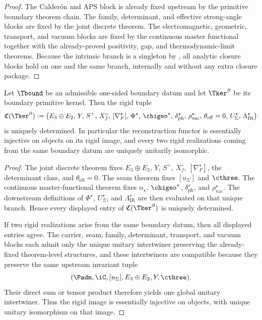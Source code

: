 \begin{proof}
The Calder\'on and APS block is already fixed upstream by the primitive boundary theorem chain.
The family, determinant, and effective strong-angle blocks are fixed by the joint discrete theorem.
The electromagnetic, geometric, transport, and vacuum blocks are fixed by the continuous master
functional together with the already-proved positivity, gap, and thermodynamic-limit theorems.
Because the intrinsic branch is a singleton by , all
analytic closure blocks hold on one and the same branch, internally and without any extra closure
package.
\end{proof}

\begin{theorem}
\label{thm:rigid-reconstruction-core}
\label{thm:canonical-rigid-reconstruction-essential-injective}
Let $\Tbound$ be an admissible one-sided boundary datum and let $\Tker^\partial$ be its boundary
primitive kernel. Then the rigid tuple
\[
\mathfrak C(\Tker^\partial)
:=
\bigl(
E_3\oplus E_2,\,
Y,\,
S^+,\,
X_f^\circ,\,
[\nabla_F^\star],\,
\Phi^\star,\,
\chigeo^\star,\,
\delta_{\mathrm{ph}}^\star,\,
\rho_{\mathrm{vac}}^\star,\,
\theta_{\mathrm{eff}}=0,\,
U_\Sigma^\star,\,
\Lambda_{\mathrm{IR}}^\star
\bigr)
\]
is uniquely determined. In particular the reconstruction functor is essentially injective on
objects on its rigid image, and every two rigid realizations coming from the same boundary datum are
uniquely unitarily isomorphic.
\end{theorem}

\begin{proof}
The joint discrete theorem fixes $E_3\oplus E_2$, $Y$, $S^+$, $X_f^\circ$, $[\nabla_F^\star]$, the
determinant class, and $\theta_{\mathrm{eff}}=0$. The seam theorem fixes $[u_\Sigma]$ and
$\cthree$. The continuous master-functional theorem fixes $\alpha_\star$, $\chigeo^\star$,
$\delta_{\mathrm{ph}}^\star$, and $\rho_{\mathrm{vac}}^\star$. The downstream definitions of
$\Phi^\star$, $U_\Sigma^\star$, and $\Lambda_{\mathrm{IR}}^\star$ are then evaluated on that unique
branch. Hence every displayed entry of $\mathfrak C(\Tker^\partial)$ is uniquely determined.

If two rigid realizations arise from the same boundary datum, then all displayed entries agree. The
carrier, seam, family, determinant, transport, and vacuum blocks each admit only the unique
unitary intertwiner preserving the already-fixed theorem-level structures, and these intertwiners
are compatible because they preserve the same upstream invariant tuple
\[
(\Padm,\iC,[u_\Sigma],E_3\oplus E_2,Y,\cthree).
\]
Their direct sum or tensor product therefore yields one global unitary intertwiner. Thus the rigid
image is essentially injective on objects, with unique unitary isomorphism on that image.
\end{proof}
